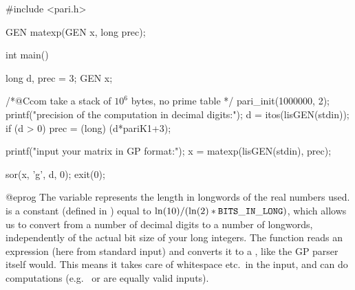 \bprog
#include <pari.h>

GEN matexp(GEN x, long prec);

int
main()
{
  long d, prec = 3;
  GEN x;

  /*@Ccom take a stack of $10^6$ bytes, no prime table */
  pari_init(1000000, 2);
  printf("precision of the computation in decimal digits:\n");
  d = itos(lisGEN(stdin));
  if (d > 0) prec = (long) (d*pariK1+3);

  printf("input your matrix in GP format:\n");
  x = matexp(lisGEN(stdin), prec);

  sor(x, 'g', d, 0);
  exit(0);
}@eprog
\noindent
The variable  represents the length in longwords of the real
numbers used.  is a constant (defined in ) equal
to $\ln(10) / (\ln(2) * {\tt BITS\_IN\_LONG})$, which allows us to convert
from a number of decimal digits to a number of longwords, independently of
the actual bit size of your long integers. The function  reads an
expression (here from standard input) and converts it to a , like
the GP parser itself would. This means it takes care of whitespace etc.\ in
the input, and can do computations (e.g.~ or \kbd{[1,0; 0,1]}
are equally valid inputs).

